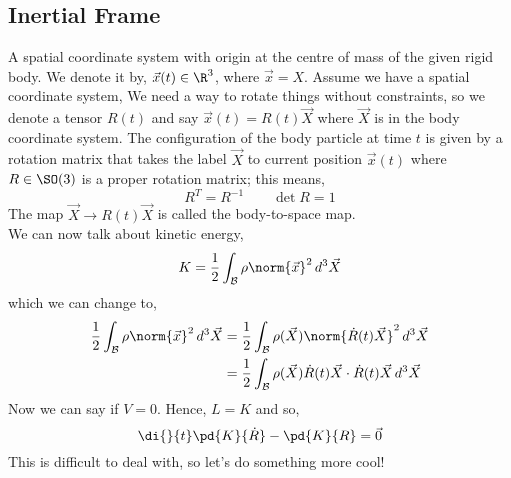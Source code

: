 \subsection{Inertial Frame}
A spatial coordinate system with origin at the centre of mass of the given rigid body. We denote it by, $\vec{x}(t) \in \R^3$, where $\vec x = X$. Assume we have a spatial coordinate system,
We need a way to rotate things without constraints, so we denote a tensor $R(t)$ and say $\vec x(t) = R(t)\vec X$ where $\vec X$ is in the body coordinate system. The configuration of the body particle at time $t$ is given by a rotation matrix that takes the label $\vec X$ to current position $\vec x(t)$ where $R \in \SO(3)$ is a proper rotation matrix; this means,
$$ R^T = R^{-1} \qquad \det R = 1 $$
The map $\vec X \to R(t)\vec X$ is called the body-to-space map. \\

We can now talk about kinetic energy,
$$ K = \frac{1}{2}\int_\mathcal{B} \rho \norm{\vec x}^2\, d^3\vec X$$
which we can change to,
\begin{align*}
  \frac{1}{2}\int_\mathcal{B} \rho \norm{\vec x}^2\, d^3\vec X &= \frac{1}{2}\int_\mathcal{B} \rho(\vec X)\norm{\dot R(t)\vec X}^2 \,d^3\vec X\\
  &= \frac{1}{2}\int_\mathcal{B} \rho(\vec X)\dot R(t)\vec X \cdot \dot R(t)\vec X \,d^3\vec X\\
\end{align*}
Now we can say if $V = 0$. Hence, $L = K$ and so,
$$ \di{}{t}\pd{K}{\dot R} - \pd{K}{R} = \vec 0 $$
This is difficult to deal with, so let's do something more cool! \\


